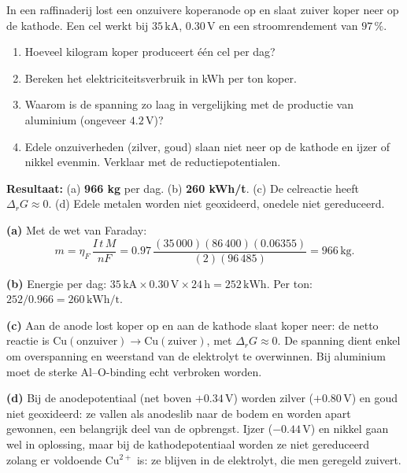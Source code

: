 \begin{oefening}
In een raffinaderij lost een onzuivere koperanode op en slaat zuiver koper neer op de kathode. Een cel werkt bij \(35\,\mathrm{kA}\), \(0.30\,\mathrm{V}\) en een stroomrendement van \(97\,\%\).

\begin{enumerate}
\item[(a)]
  Hoeveel kilogram koper produceert \'e\'en cel per dag?
\item[(b)]
  Bereken het elektriciteitsverbruik in kWh per ton koper.
\item[(c)]
  Waarom is de spanning zo laag in vergelijking met de productie van aluminium (ongeveer \(4.2\,\mathrm{V}\))?
\item[(d)]
  Edele onzuiverheden (zilver, goud) slaan niet neer op de kathode en ijzer of nikkel evenmin. Verklaar met de reductiepotentialen.
\end{enumerate}
\end{oefening}
\begin{oplossing}
\textbf{Resultaat:} (a) \textbf{966 kg} per dag. (b) \textbf{260 kWh/t}. (c) De celreactie heeft \(\Delta_rG \approx 0\). (d) Edele metalen worden niet geoxideerd, onedele niet gereduceerd.

\textbf{(a)} Met de wet van Faraday:
\[
m = \eta_F\,\frac{I\,t\,M}{nF} = 0.97\,\frac{(35\,000)(86\,400)(0.06355)}{(2)(96\,485)} = 966\,\mathrm{kg}.
\]

\textbf{(b)} Energie per dag: \(35\,\mathrm{kA}\times0.30\,\mathrm{V}\times24\,\mathrm{h} = 252\,\mathrm{kWh}\). Per ton: \(252/0.966 = 260\,\mathrm{kWh/t}\).

\textbf{(c)} Aan de anode lost koper op en aan de kathode slaat koper neer: de netto reactie is \(\mathrm{Cu(onzuiver)} \rightarrow \mathrm{Cu(zuiver)}\), met \(\Delta_rG \approx 0\). De spanning dient enkel om overspanning en weerstand van de elektrolyt te overwinnen. Bij aluminium moet de sterke Al--O-binding echt verbroken worden.

\textbf{(d)} Bij de anodepotentiaal (net boven \(+0.34\,\mathrm{V}\)) worden zilver (\(+0.80\,\mathrm{V}\)) en goud niet geoxideerd: ze vallen als anodeslib naar de bodem en worden apart gewonnen, een belangrijk deel van de opbrengst. Ijzer (\(-0.44\,\mathrm{V}\)) en nikkel gaan wel in oplossing, maar bij de kathodepotentiaal worden ze niet gereduceerd zolang er voldoende \(\mathrm{Cu^{2+}}\) is: ze blijven in de elektrolyt, die men geregeld zuivert.
\end{oplossing}

